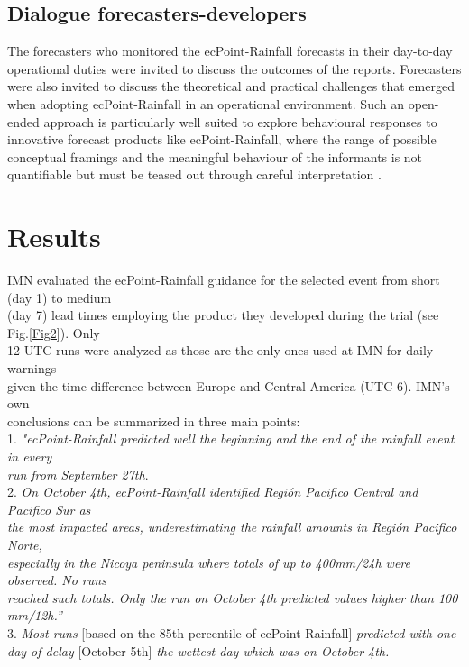 \documentclass[twocol]{ametsocV5} %
\begin{document}
\subsection{Dialogue forecasters-developers}
The forecasters who monitored the ecPoint-Rainfall forecasts in their day-to-day operational duties were invited to discuss the outcomes of the reports. Forecasters were also invited to discuss the theoretical and practical challenges that emerged when adopting ecPoint-Rainfall in an operational environment. Such an open-ended approach is particularly well suited to explore behavioural responses to innovative forecast products like ecPoint-Rainfall, where the range of possible conceptual framings and the meaningful behaviour of the informants is not quantifiable but must be teased out through careful interpretation \citep{Patton2002}.	


\section{Results}

IMN evaluated the ecPoint-Rainfall guidance for the selected event from short (day 1) to medium \\ (day 7) lead times employing the product they developed during the trial (see Fig.\ref{Fig2}). Only \\ 12 UTC runs were analyzed as those are the only ones used at IMN for daily warnings \\ given the time difference between Europe and Central America (UTC-6). IMN’s own \\ conclusions can be summarized in three main points:\\

1. \textit{"ecPoint-Rainfall predicted well the beginning and the end of the rainfall event in every} \\ 
\textit{run from September 27th}. \\
2. \textit{On October 4th, ecPoint-Rainfall identified Región Pacifico Central and Pacifico Sur as} \\ 
\textit{the most impacted areas, underestimating the rainfall amounts in Región Pacifico Norte,} \\
\textit{especially in the Nicoya peninsula where totals of up to 400mm/24h were observed. No runs} \\
\textit{reached such totals. Only the run on October 4th predicted values higher than 100 mm/12h.”} \\
3. \textit{Most runs} [based on the 85th percentile of ecPoint-Rainfall] \textit{predicted with one} \\ 
\textit{day of delay} [October 5th] \textit{the wettest day which was on October 4th.}  \\
\end{document}
